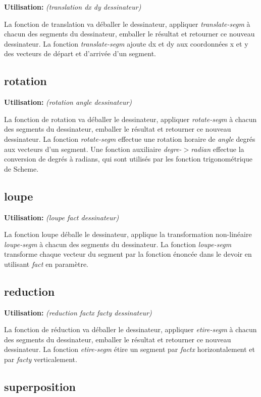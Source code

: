 \documentclass[10pt]{article}
\newcommand{\usage}[1]{\textbf{Utilisation: }\emph{#1}}
\begin{document}
\usage{(translation dx dy dessinateur)}

La fonction de translation va déballer le dessinateur, appliquer
\emph{translate-segm} à chacun des segments du dessinateur, emballer
le résultat et retourner ce nouveau dessinateur.  La fonction
\emph{translate-segm} ajoute dx et dy aux coordonnées x et y des
vecteurs de départ et d'arrivée d'un segment.


\subsection{rotation}

\usage{(rotation angle dessinateur)}

La fonction de rotation va déballer le dessinateur, appliquer
\emph{rotate-segm} à chacun des segments du dessinateur, emballer le
résultat et retourner ce nouveau dessinateur.  La fonction
\emph{rotate-segm} effectue une rotation horaire de \emph{angle}
degrés aux vecteurs d'un segment.  Une fonction auxiliaire
\emph{degre-$>$radian} effectue la conversion de degrés à radians,
qui sont utilisés par les fonction trigonométrique de Scheme.


\subsection{loupe}

\usage{(loupe fact dessinateur)}

La fonction loupe déballe le dessinateur, applique la transformation
non-linéaire \emph{loupe-segm} à chacun des segments du
dessinateur. La fonction \emph{loupe-segm} transforme chaque vecteur
du segment par la fonction énoncée dans le devoir en utilisant
\emph{fact} en paramètre.

\subsection{reduction}

\usage{(reduction factx facty dessinateur)}

La fonction de réduction va déballer le dessinateur, appliquer
\emph{etire-segm} à chacun des segments du dessinateur, emballer le
résultat et retourner ce nouveau dessinateur.  La fonction
\emph{etire-segm} étire un segment par \emph{factx} horizontalement et
par \emph{facty} verticalement.

\subsection{superposition}
\end{document}
